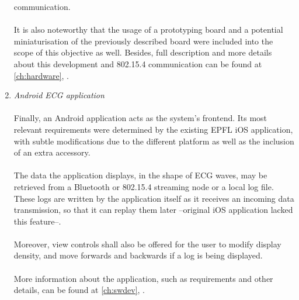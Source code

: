 \begin{enumerate}
				communication.\\\\
				It is also noteworthy that the usage of a prototyping board and a potential miniaturisation of
				the previously described board were included into the scope of this objective as well. Besides, 
				full description and more details about this development and 802.15.4 communication can be found 
				at \autoref{ch:hardware}, .\\
			\item \emph{Android ECG application}\\\\
				Finally, an Android application acts as the system's frontend. Its most relevant requirements were
				determined by the existing EPFL iOS application, with subtle modifications due to the different
				platform as well as the inclusion of an extra accessory.\\\\
				The data the application displays, in the shape of ECG waves, may be retrieved from a Bluetooth
				or 802.15.4 streaming node or a local log file. These logs are written by the application itself
				as it receives an incoming data transmission, so that it can replay them later --original
				iOS application lacked this feature--.\\\\
				Moreover, view controls shall also be offered for the user to modify display density, and move
				forwards and backwards if a log is being displayed.\\\\
				More information about the application, such as requirements and other details, can be found
				at \autoref{ch:swdev}, .\\
		\end{enumerate}
		
